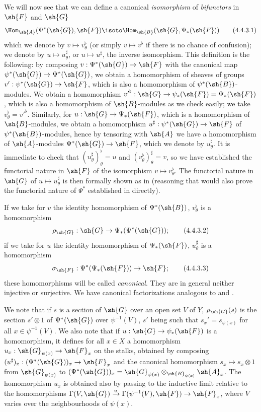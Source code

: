 \begin{env}[4.4.3]
\label{0.4.4.3}
We will now see that we can define a canonical \emph{isomorphism} of \emph{bifunctors} in
$\sh{F}$ and $\sh{G}$
\[
\label{0.4.4.3.1}
  \Hom_\sh{A}(\Psi^*(\sh{G}),\sh{F})\isoto\Hom_\sh{B}(\sh{G},\Psi_*(\sh{F}))
  \tag{4.4.3.1}
\]
which we denote by $v\mapsto v_\theta^\flat$ (or simply $v\mapsto v^\flat$ if there is no
chance of confusion); we denote by $u\mapsto u_\theta^\sharp$, or $u\mapsto u^\sharp$, the
inverse isomorphism. This definition is the following: by composing
$v:\Psi^*(\sh{G})\to\sh{F}$ with the canonical map $\psi^*(\sh{G})\to\Psi^*(\sh{G})$, we
obtain a homomorphism of sheaves of groups $v':\psi^*(\sh{G})\to\sh{F}$, which is also a
homomorphism of $\psi^*(\sh{B})$-modules. We obtain  a homomorphism
${v'}^\flat:\sh{G}\to\psi_*(\sh{F})=\Psi_*(\sh{F})$, which is also a homomorphism of
$\sh{B}$-modules as we
check easily; we take $v_\theta^\flat={v'}^\flat$. Similarly, for
$u:\sh{G}\to\Psi_*(\sh{F})$, which is a homomorphism of $\sh{B}$-modules, we obtain
 a homomorphism $u^\sharp:\psi^*(\sh{G})\to\sh{F}$ of
$\psi^*(\sh{B})$-modules, hence by tensoring with $\sh{A}$ we have a homomorphism of
$\sh{A}$-modules $\Psi^*(\sh{G})\to\sh{F}$, which we denote by $u_\theta^\sharp$. It is
immediate to check that $(u_\theta^\sharp)_\theta^\flat=u$ and
$(v_\theta^\flat)_\theta^\sharp=v$, so we have established the functorial nature in $\sh{F}$
of the isomorphism $v\mapsto v_\theta^\flat$. The functorial nature in $\sh{G}$ of
$u\mapsto u_\theta^\sharp$ is then formally shown as in  (reasoning that
would also prove the functorial nature of $\Psi^*$ established in 
directly).

If we take for $v$ the identity homomorphism of $\Psi^*(\sh{B})$, $v_\theta^\flat$ is a
homomorphism
\[
\label{0.4.4.3.2}
  \rho_\sh{G}:\sh{G}\to\Psi_*(\Psi^*(\sh{G}));
  \tag{4.4.3.2}
\]
if we take for $u$ the identity homomorphism of $\Psi_*(\sh{F})$, $u_\theta^\sharp$ is a
homomorphism
\[
\label{0.4.4.3.3}
  \sigma_\sh{F}:\Psi^*(\Psi_*(\sh{F}))\to\sh{F};
  \tag{4.4.3.3}
\]
these homomorphisms will be called \emph{canonical}. They are in general neither injective or
surjective. We have canonical factorizations analogous to  and .

We note that if $s$ is a section of $\sh{G}$ over an open set $V$ of $Y$, $\rho_\sh{G}(s)$ is
the section $s'\otimes 1$ of $\Psi^*(\sh{G})$ over $\psi^{-1}(V)$, $s'$ being such that
$s_x'=s_{\psi(x)}$ for all $x\in\psi^{-1}(V)$. We also note that if
$u:\sh{G}\to\psi_*(\sh{F})$ is a homomorphism, it defines for all $x\in X$ a homomorphism
$u_x:\sh{G}_{\psi(x)}\to\sh{F}_x$ on the stalks, obtained by composing
$(u^\sharp)_x:(\Psi^*(\sh{G}))_x\to\sh{F}_x$ and the canonical homomorphism
$s_x\mapsto s_x\otimes 1$ from $\sh{G}_{\psi(x)}$ to
$(\Psi^*(\sh{G}))_x=\sh{G}_{\psi(x)}\otimes_{\sh{B}_{\psi(x)}}\sh{A}_x$. The homomorphism
$u_x$ is obtained also by passing to the inductive limit relative to the homomorphisms
$\Gamma(V,\sh{G})\xrightarrow{u}\Gamma(\psi^{-1}(V),\sh{F})\to\sh{F}_x$, where $V$ varies
over the neighbourhoods of $\psi(x)$.
\end{env}

